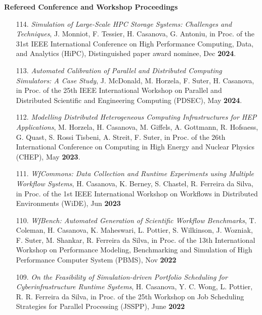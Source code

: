\noindent
{\bf Refereed Conference and Workshop Proceedings}

\begin{enumerate}

    \item [114.] {\it Simulation of Large-Scale HPC Storage Systems: Challenges and Techniques}, J. Monniot, F. Tessier, H. Casanova, G. Antoniu, in Proc. of the 31st IEEE International Conference on High Performance Computing, Data, and Analytics (HiPC), Distinguished paper award nominee, Dec {\bf 2024}.

    \item [113.] {\it Automated Calibration of Parallel and  Distributed Computing Simulators: A Case Study}, J. McDonald, M. Horzela, F. Suter, H. Casanova, in  Proc. of the 25th IEEE International Workshop on Parallel and Distributed Scientific and Engineering Computing (PDSEC), May {\bf 2024}.

    \item [112.] {\it Modelling Distributed Heterogeneous Computing Infrastructures for HEP Applications}, M. Horzela, H. Casanova, M. Giffels, A. Gottmann, R. Hofsaess, G. Quast, S. Rossi Tisbeni, A. Streit, F. Suter, in  Proc. of the 26th International Conference on Computing in High Energy and Nuclear Physics (CHEP), May {\bf 2023}.

    \item [111.] {\it WfCommons: Data Collection and Runtime Experiments using Multiple Workflow Systems}, H. Casanova, K. Berney, S. Chastel, R. Ferreira da Silva, in Proc. of the 1st IEEE International Workshop on Workflows in Distributed Environments (WiDE), Jun {\bf 2023}

    \item [110.] {\it WfBench: Automated Generation of Scientific Workflow Benchmarks}, T. Coleman, H. Casanova, K. Maheswari, L. Pottier, S. Wilkinson, J. Wozniak, F. Suter, M. Shankar, R. Ferreira da Silva, in Proc. of the 13th International Workshop on Performance Modeling, Benchmarking and Simulation of High Performance Computer System (PBMS), Nov {\bf 2022}


\item [109.] {\it On the Feasibility of Simulation-driven Portfolio Scheduling for Cyberinfrastructure Runtime Systems}, H. Casanova, Y. C. Wong, L. Pottier, R. R. Ferreira da Silva, in Proc. of the 25th Workshop on Job Scheduling Strategies for Parallel Processing (JSSPP), June {\bf 2022}


\end{enumerate}
